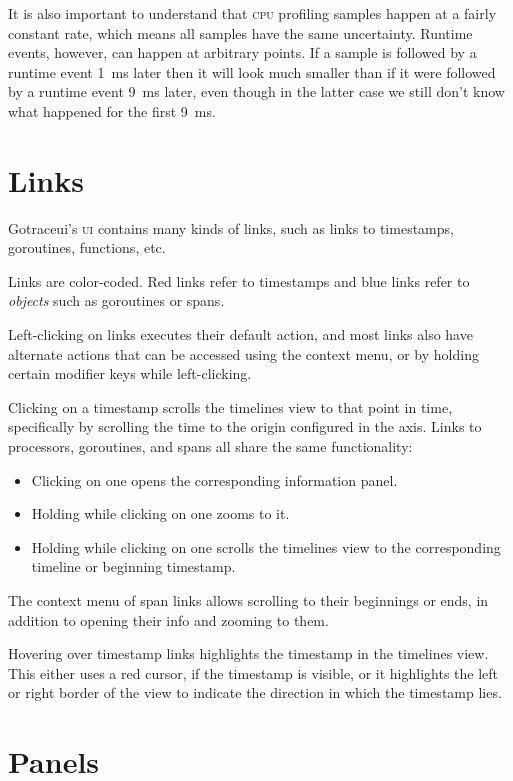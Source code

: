 \documentclass[10pt,letterpaper,oneside,openany,english]{memoir}
\newcommand{\noun}[1]{{\emph{#1}}}
\newcommand{\shortcut}{\ctrl{} or \cmdmac}
\begin{document}
It is also important to understand that \textsc{cpu} profiling samples happen at a fairly constant rate, which means all samples have the same uncertainty.
Runtime events, however, can happen at arbitrary points.
If a sample is followed by a runtime event \qty{1}{\milli\second} later then it will look much smaller than if it were followed by a runtime event \qty{9}{\milli\second} later,
even though in the latter case we still don't know what happened for the first \qty{9}{\milli\second}.

\section{Links}

Gotraceui's \textsc{ui} contains many kinds of links, such as links to timestamps, goroutines, functions, etc.

Links are color-coded. Red links refer to timestamps and blue links refer to \noun{objects} such as goroutines or spans.

Left-clicking on links executes their default action,
and most links also have alternate actions that can be accessed using the context menu,
or by holding certain modifier keys while left-clicking.

Clicking on a timestamp scrolls the timelines view to that point in time, specifically by scrolling the time to the origin configured in the axis.
Links to processors, goroutines, and spans all share the same functionality:
\begin{itemize}
\item Clicking on one opens the corresponding information panel.
\item Holding \keys{\shortcut} while clicking on one zooms to it.
\item Holding \keys{\shift} while clicking on one scrolls the timelines view to the corresponding timeline or beginning timestamp.
\end{itemize}

The context menu of span links allows scrolling to their beginnings or ends, in addition to opening their info and zooming to them.

Hovering over timestamp links highlights the timestamp in the timelines view.
This either uses a red cursor, if the timestamp is visible,
or it highlights the left or right border of the view to indicate the direction in which the timestamp lies.

\section{Panels}\label{panels}
\end{document}
